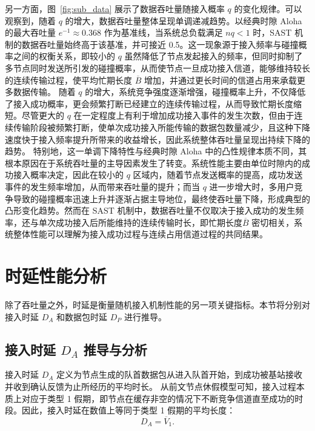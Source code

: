 另一方面，图~\ref{fig:sub_data} 展示了数据吞吐量随接入概率 $q$ 的变化规律。可以观察到，随着 $q$ 的增大，数据吞吐量整体呈现单调递减趋势。以经典时隙 Aloha 的最大吞吐量 $e^{-1} \approx 0.368$ 作为基准线，当系统总负载满足 $nq < 1$ 时，SAST 机制的数据吞吐量始终高于该基准，并可接近 0.5。这一现象源于接入频率与碰撞概率之间的权衡关系，即较小的 $q$ 虽然降低了节点发起接入的频率，但同时抑制了多节点同时发送所引发的碰撞概率，从而使节点一旦成功接入信道，能够维持较长的连续传输过程，使平均忙期长度 $\overline{B}$ 增加，并通过更长时间的信道占用来承载更多数据传输。
随着 $q$ 的增大，系统竞争强度逐渐增强，碰撞概率上升，不仅降低了接入成功概率，更会频繁打断已经建立的连续传输过程，从而导致忙期长度缩短。尽管更大的 $q$ 在一定程度上有利于增加成功接入事件的发生次数，但由于连续传输阶段被频繁打断，使单次成功接入所能传输的数据包数量减少，且这种下降速度快于接入频率提升所带来的收益增长，因此系统整体吞吐量呈现出持续下降的趋势。
特别地，这一单调下降特性与经典时隙 Aloha 中的凸性规律本质不同，其根本原因在于系统吞吐量的主导因素发生了转变。系统性能主要由单位时隙内的成功接入概率决定，因此在较小的 $q$ 区域内，随着节点发送概率的提高，成功发送事件的发生频率增加，从而带来吞吐量的提升；而当 $q$ 进一步增大时，多用户竞争导致的碰撞概率迅速上升并逐渐占据主导地位，最终使吞吐量下降，形成典型的凸形变化趋势。然而在 SAST 机制中，数据吞吐量不仅取决于接入成功的发生频率，还与单次成功接入后所能维持的连续传输时长，即忙期长度$\overline{B}$ 密切相关，系统整体性能可以理解为接入成功过程与连续占用信道过程的共同结果。



\section{时延性能分析}
\label{sec:delay_analysis}
除了吞吐量之外，时延是衡量随机接入机制性能的另一项关键指标。本节将分别对接入时延 $D_A$ 和数据包时延 $D_P$ 进行推导。

\subsection{接入时延 $D_A$ 推导与分析}

接入时延 $D_A$ 定义为节点生成的队首数据包从进入队首开始，到成功被基站接收并收到确认反馈为止所经历的平均时长。
从前文节点休假模型可知，接入过程本质上对应于类型 1 假期，即节点在缓存非空的情况下不断竞争信道直至成功的时段。因此，接入时延在数值上等同于类型 1 假期的平均长度：
\begin{equation}
	D_A = \overline{V}_1.
\end{equation}

